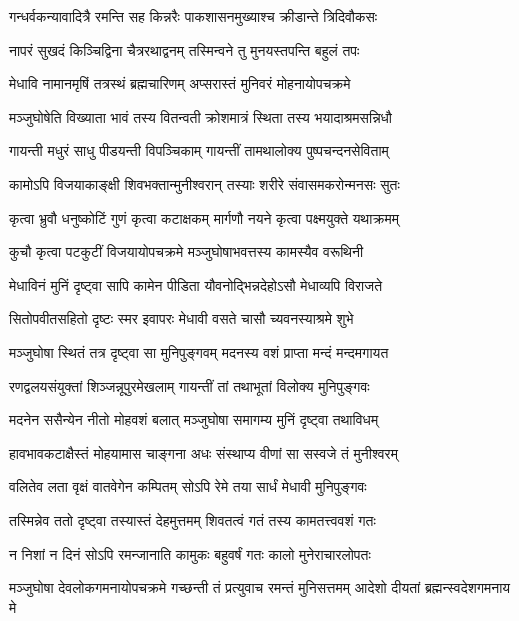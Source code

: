 \twolineshloka
{गन्धर्वकन्यावादित्रै रमन्ति सह किन्नरैः}
{पाकशासनमुख्याश्च क्रीडान्ते त्रिदिवौकसः}%

\twolineshloka
{नापरं सुखदं किञ्चिद्विना चैत्ररथाद्वनम्}
{तस्मिन्वने तु मुनयस्तपन्ति बहुलं तपः}%

\twolineshloka
{मेधावि नामानमृषिं तत्रस्थं ब्रह्मचारिणम्}
{अप्सरास्तं मुनिवरं मोहनायोपचक्रमे}%

\twolineshloka
{मञ्जुघोषेति विख्याता भावं तस्य वितन्वती}
{क्रोशमात्रं स्थिता तस्य भयादाश्रमसन्निधौ}%

\twolineshloka
{गायन्ती मधुरं साधु पीडयन्ती विपञ्चिकाम्}
{गायन्तीं तामथालोक्य पुष्पचन्दनसेविताम्}%

\twolineshloka
{कामोऽपि विजयाकाङ्क्षी शिवभक्तान्मुनीश्वरान्}
{तस्याः शरीरे संवासमकरोन्मनसः सुतः}%

\twolineshloka
{कृत्वा भ्रुवौ धनुष्कोटिं गुणं कृत्वा कटाक्षकम्}
{मार्गणौ नयने कृत्वा पक्ष्मयुक्ते यथाक्रमम्}%

\twolineshloka
{कुचौ कृत्वा पटकुटीं विजयायोपचक्रमे}
{मञ्जुघोषाभवत्तस्य कामस्यैव वरूथिनी}%

\twolineshloka
{मेधाविनं मुनिं दृष्ट्वा सापि कामेन पीडिता}
{यौवनोद्भिन्नदेहोऽसौ मेधाव्यपि विराजते}%

\twolineshloka
{सितोपवीतसहितो दृष्टः स्मर इवापरः}
{मेधावी वसते चासौ च्यवनस्याश्रमे शुभे}%

\twolineshloka
{मञ्जुघोषा स्थितं तत्र दृष्ट्वा सा मुनिपुङ्गवम्}
{मदनस्य वशं प्राप्ता मन्दं मन्दमगायत}%

\twolineshloka
{रणद्वलयसंयुक्तां शिञ्जन्नूपुरमेखलाम्}
{गायन्तीं तां तथाभूतां विलोक्य मुनिपुङ्गवः}%

\twolineshloka
{मदनेन ससैन्येन नीतो मोहवशं बलात्}
{मञ्जुघोषा समागम्य मुनिं दृष्ट्वा तथाविधम्}%

\twolineshloka
{हावभावकटाक्षैस्तं मोहयामास चाङ्गना}
{अधः संस्थाप्य वीणां सा सस्वजे तं मुनीश्वरम्}%

\twolineshloka
{वलितेव लता वृक्षं वातवेगेन कम्पितम्}
{सोऽपि रेमे तया सार्धं मेधावी मुनिपुङ्गवः}%

\twolineshloka
{तस्मिन्नेव ततो दृष्ट्वा तस्यास्तं देहमुत्तमम्}
{शिवतत्वं गतं तस्य कामतत्त्ववशं गतः}%

\twolineshloka
{न निशां न दिनं सोऽपि रमन्जानाति कामुकः}
{बहुवर्षं गतः कालो मुनेराचारलोपतः}%

\threelineshloka
{मञ्जुघोषा देवलोकगमनायोपचक्रमे}
{गच्छन्ती तं प्रत्युवाच रमन्तं मुनिसत्तमम्}
{आदेशो दीयतां ब्रह्मन्स्वदेशगमनाय मे}%


